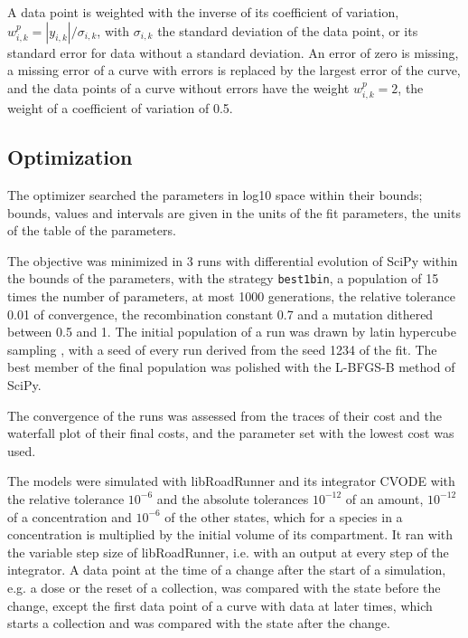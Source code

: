 A data point is weighted with the inverse of its coefficient of variation, $w^{p}_{i,k} = |y_{i,k}| / \sigma_{i,k}$, with $\sigma_{i,k}$ the standard deviation of the data point, or its standard error for data without a standard deviation. An error of zero is missing, a missing error of a curve with errors is replaced by the largest error of the curve, and the data points of a curve without errors have the weight $w^{p}_{i,k} = 2$, the weight of a coefficient of variation of 0.5.

\subsection{Optimization}

The optimizer searched the parameters in log10 space within their bounds; bounds, values and intervals are given in the units of the fit parameters, the units of the table of the parameters.

The objective was minimized in 3 runs with differential evolution \cite{Storn1997} of SciPy \cite{Virtanen2020} within the bounds of the parameters, with the strategy \texttt{best1bin}, a population of 15 times the number of parameters, at most 1000 generations, the relative tolerance 0.01 of convergence, the recombination constant 0.7 and a mutation dithered between 0.5 and 1. The initial population of a run was drawn by latin hypercube sampling \cite{McKay1979}, with a seed of every run derived from the seed 1234 of the fit. The best member of the final population was polished with the L-BFGS-B method of SciPy.

The convergence of the runs was assessed from the traces of their cost and the waterfall plot of their final costs, and the parameter set with the lowest cost was used.

The models were simulated with libRoadRunner \cite{Welsh2023} and its integrator CVODE \cite{Hindmarsh2005} with the relative tolerance $10^{-6}$ and the absolute tolerances $10^{-12}$ of an amount, $10^{-12}$ of a concentration and $10^{-6}$ of the other states, which for a species in a concentration is multiplied by the initial volume of its compartment. It ran with the variable step size of libRoadRunner, i.e. with an output at every step of the integrator. A data point at the time of a change after the start of a simulation, e.g. a dose or the reset of a collection, was compared with the state before the change, except the first data point of a curve with data at later times, which starts a collection and was compared with the state after the change.

